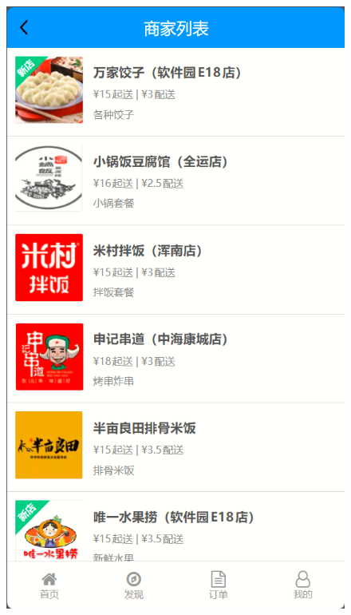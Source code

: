 \begin{figure}[h]
\begin{minipage}[b]{0.3\linewidth}
        \includegraphics[width=\linewidth]{uiFigs/商家列表.png}
     \end{minipage}
    \begin{minipage}[b]{0.3\linewidth}

\end{minipage}
\end{figure}
